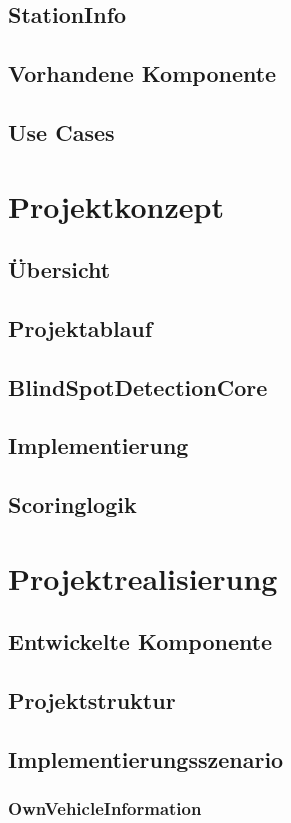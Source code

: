 \documentclass[15pt]{scrartcl}
\begin{document}
\subsection{StationInfo}
\subsection{Vorhandene Komponente}
\subsection{Use Cases}

\newpage
\section{Projektkonzept}
\subsection{Übersicht}
\subsection{Projektablauf}
\subsection{BlindSpotDetectionCore}
\subsection{Implementierung}
\subsection{Scoringlogik}

\newpage
\section{Projektrealisierung}
\subsection{Entwickelte Komponente}
\subsection{Projektstruktur}
\subsection{Implementierungsszenario}
\subsubsection{OwnVehicleInformation}
\end{document}
